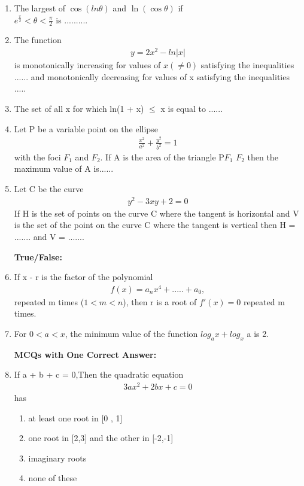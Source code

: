 \renewcommand{\theequation}{\theenumi}
\begin{enumerate}[label=\arabic*.,ref=\thesubsection.\theenumi]

\item The largest of $\cos(ln \theta)$ and $\ln(\cos \theta)$ if\\ $e^{\frac{\pi}{2}} < \theta < \frac{\pi}{2}$ is ..........

\item The function 
\begin{align*} 
y = 2x^2 - ln|x|
\end{align*}
is monotonically increasing for values of $x( \neq 0)$ satisfying the inequalities ...... and monotonically decreasing for values of x satisfying the inequalities .....

\item The set of all x for which ln(1 + x) $ \leq $ x is equal to ......

\item Let P be a variable point on the ellipse
\begin{align} 
\frac{x^2}{a^2} + \frac{y^2}{b^2} = 1
\end{align} 
with the foci $F_1$ and $F_2$. If A is the area of the triangle P$F_1$ $F_2$ then the maximum value of A is......

\item Let C be the curve 
\begin{align}
y^2 - 3xy + 2 = 0
\end{align}
If H is the set of points on the curve C where the tangent is horizontal and V is the set of the point on the curve C where the tangent is vertical then H = ....... and V = ....... 

\textbf{True/False:}

\item If x - r is the factor of the polynomial 
\begin{align*}
f(x)= a_nx^4 + .....+ a_0,
\end{align*} 
repeated m times ($1 < m < n$), then r is a root of $f'(x) = 0$ repeated m times.

\item For $0 < a < x$, the minimum value of the function $log_a x + log_x$ a is 2.

\textbf{MCQs with One Correct Answer:}

\item If a + b + c = 0,Then the quadratic equation 
\begin{align}
3ax^2 + 2bx + c = 0
\end{align} 
has 
\begin{enumerate}
\item at least one root in [0 , 1]
\item one root in [2,3] and the other in [-2,-1]
\item imaginary roots
\item none of these
\end{enumerate}


\end{enumerate}
